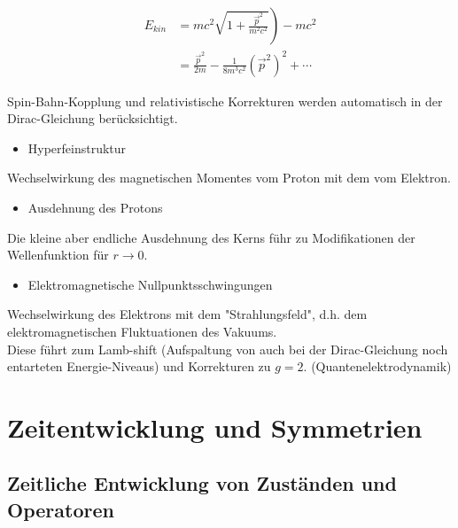 \documentclass[10pt, letterpaper]{article}
\begin{document}
$$
\begin{aligned}
E_{k i n} & \left.=m c^{2} \sqrt{1+\frac{\vec{p}^{2}}{m^{2} c^{2}}}\right)-m c^{2} \\
& =\frac{\vec{p}^{2}}{2 m}-\frac{1}{8 m^{3} c^{2}}\left(\vec{p}^{2}\right)^{2}+\cdots
\end{aligned}
$$

Spin-Bahn-Kopplung und relativistische Korrekturen werden automatisch in der Dirac-Gleichung berücksichtigt.

\begin{itemize}
  \item Hyperfeinstruktur
\end{itemize}

Wechselwirkung des magnetischen Momentes vom Proton mit dem vom Elektron.

\begin{itemize}
  \item Ausdehnung des Protons
\end{itemize}

Die kleine aber endliche Ausdehnung des Kerns führ zu Modifikationen der Wellenfunktion für $r \rightarrow 0$.

\begin{itemize}
  \item Elektromagnetische Nullpunktsschwingungen
\end{itemize}

Wechselwirkung des Elektrons mit dem "Strahlungsfeld", d.h. dem elektromagnetischen Fluktuationen des Vakuums.\\
Diese führt zum Lamb-shift (Aufspaltung von auch bei der Dirac-Gleichung noch entarteten Energie-Niveaus) und Korrekturen zu $g=2$. (Quantenelektrodynamik)





\pagebreak










\section{Zeitentwicklung und Symmetrien}


\subsection{Zeitliche Entwicklung von Zuständen und Operatoren}
\end{document}
